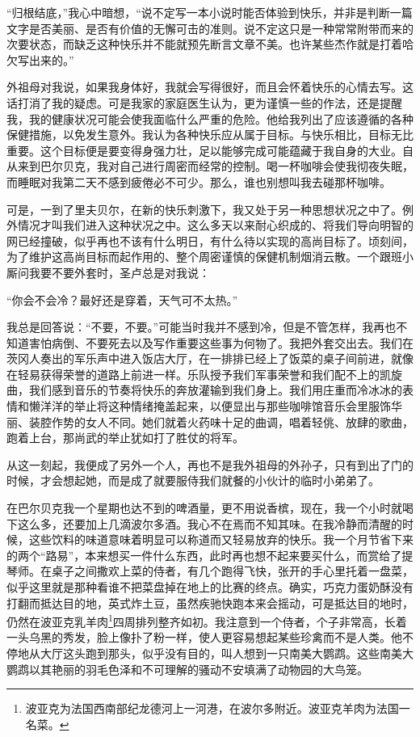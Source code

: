 \par “归根结底，”我心中暗想，“说不定写一本小说时能否体验到快乐，并非是判断一篇文字是否美丽、是否有价值的无懈可击的准则。说不定这只是一种常常附带而来的次要状态，而缺乏这种快乐并不能就预先断言文章不美。也许某些杰作就是打着哈欠写出来的。”
\par 外祖母对我说，如果我身体好，我就会写得很好，而且会怀着快乐的心情去写。这话打消了我的疑虑。可是我家的家庭医生认为，更为谨慎一些的作法，还是提醒我，我的健康状况可能会使我面临什么严重的危险。他给我列出了应该遵循的各种保健措施，以免发生意外。我认为各种快乐应从属于目标。与快乐相比，目标无比重要。这个目标便是要变得身强力壮，足以能够完成可能蕴藏于我自身的大业。自从来到巴尔贝克，我对自己进行周密而经常的控制。喝一杯咖啡会使我彻夜失眠，而睡眠对我第二天不感到疲倦必不可少。那么，谁也别想叫我去碰那杯咖啡。
\par 可是，一到了里夫贝尔，在新的快乐刺激下，我又处于另一种思想状况之中了。例外情况才叫我们进入这种状况之中。这么多天以来耐心织成的、将我们导向明智的网已经撞破，似乎再也不该有什么明日，有什么待以实现的高尚目标了。顷刻间，为了维护这高尚目标而起作用的、整个周密谨慎的保健机制烟消云散。一个跟班小厮问我要不要外套时，圣卢总是对我说：
\par “你会不会冷？最好还是穿着，天气可不太热。”
\par 我总是回答说：“不要，不要。”可能当时我并不感到冷，但是不管怎样，我再也不知道害怕病倒、不要死去以及写作重要这些事为何物了。我把外套交出去。我们在茨冈人奏出的军乐声中进入饭店大厅，在一排排已经上了饭菜的桌子间前进，就像在轻易获得荣誉的道路上前进一样。乐队授予我们军事荣誉和我们配不上的凯旋曲，我们感到音乐的节奏将快乐的奔放灌输到我们身上。我们用庄重而冷冰冰的表情和懒洋洋的举止将这种情绪掩盖起来，以便显出与那些咖啡馆音乐会里服饰华丽、装腔作势的女人不同。她们就着火药味十足的曲调，唱着轻佻、放肆的歌曲，跑着上台，那尚武的举止犹如打了胜仗的将军。
\par 从这一刻起，我便成了另外一个人，再也不是我外祖母的外孙子，只有到出了门的时候，才会想起她，而是成了就要服侍我们就餐的小伙计的临时小弟弟了。
\par 在巴尔贝克我一个星期也达不到的啤酒量，更不用说香槟，现在，我一个小时就喝下这么多，还要加上几滴波尔多酒。我心不在焉而不知其味。在我冷静而清醒的时候，这些饮料的味道意味着明显可以称道而又轻易放弃的快乐。我一个月节省下来的两个“路易”，本来想买一件什么东西，此时再也想不起来要买什么，而赏给了提琴师。在桌子之间撒欢上菜的侍者，有几个跑得飞快，张开的手心里托着一盘菜，似乎这里就是那种看谁不把菜盘掉在地上的比赛的终点。确实，巧克力蛋奶酥没有打翻而抵达目的地，英式炸土豆，虽然疾驰快跑本来会摇动，可是抵达目的地时，仍然在波亚克乳羊肉\footnote{波亚克为法国西南部纪龙德河上一河港，在波尔多附近。波亚克羊肉为法国一名菜。}四周排列整齐如初。我注意到一个侍者，个子非常高，长着一头乌黑的秀发，脸上像扑了粉一样，使人更容易想起某些珍禽而不是人类。他不停地从大厅这头跑到那头，似乎没有目的，叫人想到一只南美大鹦鹉。这些南美大鹦鹉以其艳丽的羽毛色泽和不可理解的骚动不安填满了动物园的大鸟笼。
